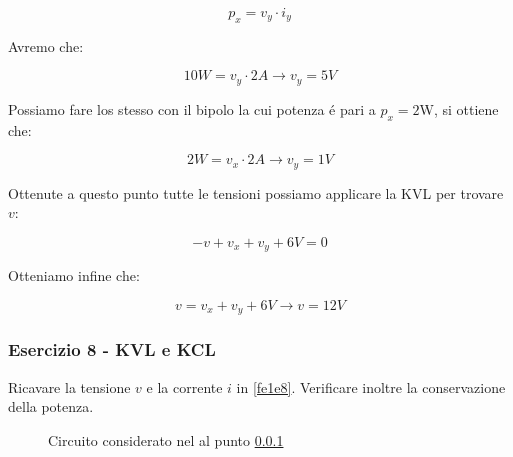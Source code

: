 \documentclass[../main.tex]{subfiles}
\begin{document}
\begin{equation}
	p_x = v_y \cdot i_y
\end{equation}

Avremo che:

\begin{equation}
	10 \unit{W} = v_y \cdot 2\unit{A} \rightarrow v_y = 5 \unit{V}
\end{equation}

Possiamo fare los stesso con il bipolo la cui potenza é pari a $p_x = 2$W, si ottiene che:

\begin{equation}
	2 \unit{W} = v_x \cdot 2\unit{A} \rightarrow v_y = 1 \unit{V}
\end{equation}

Ottenute a questo punto tutte le tensioni possiamo applicare la KVL per trovare $v$:

\begin{equation}
	-v + v_x + v_y + 6\unit{V} = 0
\end{equation}

Otteniamo infine che:

\begin{equation}
	v = v_x + v_y + 6\unit{V} \rightarrow v = 12\unit{V}
\end{equation}



\vspace*{1.5cm}
\subsubsection{Esercizio 8 - KVL e KCL}
\label{e1e8}

Ricavare la tensione $v$ e la corrente $i$ in \autoref{fe1e8}. Verificare inoltre la conservazione della potenza.

\begin{figure}[h!]
\begin{center}


\end{center}
\caption{Circuito considerato nel al punto \ref{e1e8}}
\label{fe1e8}	
\end{figure}
\end{document}
